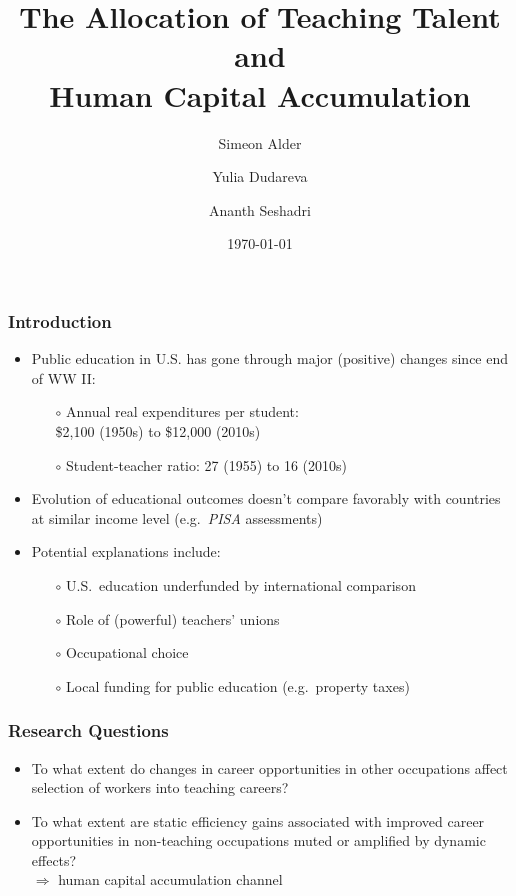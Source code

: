 \documentclass[11pt]{beamer}
\title{The Allocation of Teaching Talent and \\Human Capital Accumulation}
\author[shortname]{Simeon Alder\inst{1} \and Yulia Dudareva\inst{1} \and Ananth Seshadri\inst{1}}
\institute[shortinst]{\inst{1} University of Wisconsin--Madison}
\date{\today}
\begin{document}
	
	\begin{frame}
		\titlepage
	\end{frame}
	
	\begin{frame}
		\frametitle{Introduction}
		\vfill
		\begin{itemize}
			\item Public education in U.S. has gone through major (positive) changes since end of WW II:
			\begin{itemize}
				\item[$\circ$] Annual real expenditures per student: \\
				\$2,100 (1950s) to \$12,000 (2010s)
				\item[$\circ$] Student-teacher ratio: 27 (1955) to 16 (2010s)
			\end{itemize}
			\vfill
			\item Evolution of educational outcomes doesn't compare favorably with countries at similar income level (e.g.~{\it PISA} assessments)
			\vfill
			\item Potential explanations include:
			\begin{itemize}
				\item[$\circ$] U.S.~education underfunded by international comparison
				\item[$\circ$] Role of (powerful) teachers' unions \pause
				\item[$\circ$] \alert{Occupational choice} \pause
				\item[$\circ$] Local funding for public education (e.g.~property taxes)
			\end{itemize}
		\end{itemize}
		\vfill
	\end{frame}
	
	\begin{frame}
		\frametitle{Research Questions}
		\vfill
		\begin{itemize}
			\item To what extent do changes in career opportunities in other occupations affect selection of workers into teaching careers?
			\vfill
			\item To what extent are static efficiency gains associated with improved career opportunities in non-teaching occupations muted or amplified by dynamic effects?\\
			$\Rightarrow$ human capital accumulation channel
		\end{itemize}
		\vfill
	\end{frame}
	
\end{document}
